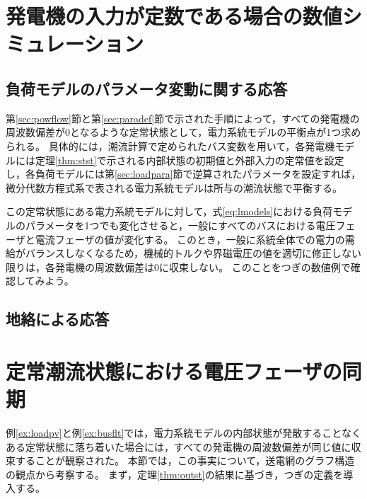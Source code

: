 \documentclass[tombow,dvipdfmx]{corona-a5}
\begin{document}
\section{発電機の入力が定数である場合の数値シミュレーション}

\subsection{負荷モデルのパラメータ変動に関する応答}

第\ref{sec:powflow}節と第\ref{sec:paradef}節で示された手順によって，すべての発電機の周波数偏差が0となるような定常状態として，電力系統モデルの平衡点が1つ求められる。
具体的には，潮流計算で定められたバス変数を用いて，各発電機モデルには定理\ref{thm:stst}で示される内部状態の初期値と外部入力の定常値を設定し，各負荷モデルには第\ref{sec:loadpara}節で逆算されたパラメータを設定すれば，微分代数方程式系で表される電力系統モデルは所与の潮流状態で平衡する。

この定常状態にある電力系統モデルに対して，式\ref{eq:lmodels}における負荷モデルのパラメータを1つでも変化させると，一般にすべてのバスにおける電圧フェーザと電流フェーザの値が変化する。
このとき，一般に系統全体での電力の需給がバランスしなくなるため，機械的トルクや界磁電圧の値を適切に修正しない限りは，各発電機の周波数偏差は0に収束しない。
このことをつぎの数値例で確認してみよう。

\begin{例}[負荷モデルのパラメータを変化させたときの電力系統モデルの時間応答]\label{ex:loadpv}
\end{例}


\subsection{地絡による応答}

\begin{例}[バス地絡が発生したときの電力系統モデルの時間応答]\label{ex:busflt}
\end{例}


\section{定常潮流状態における電圧フェーザの同期}\label{sec:phsync}

例\ref{ex:loadpv}と例\ref{ex:busflt}では，電力系統モデルの内部状態が発散することなくある定常状態に落ち着いた場合には，すべての発電機の周波数偏差が同じ値に収束することが観察された。
本節では，この事実について，送電網のグラフ構造の観点から考察する。
まず，定理\ref{thm:outst}の結果に基づき，つぎの定義を導入する。
\end{document}
